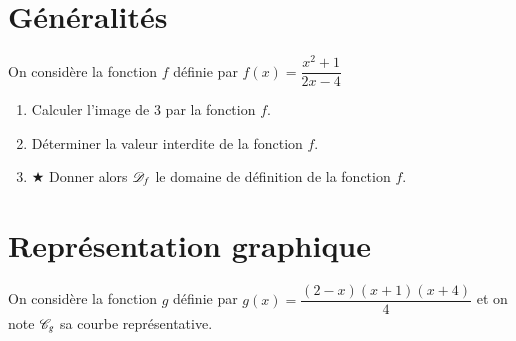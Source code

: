 \documentclass[oneside,12pt]{exam}          %
\begin{document}
\section{Généralités}
On considère la fonction $f$ définie par $f(x) = \dfrac{x^2 + 1}{2x - 4}$
\begin{enumerate}
	\item Calculer l'image de $3$ par la fonction $f$.
	\item Déterminer la valeur interdite de la fonction $f$.
	\item $\bigstar$ Donner alors ${\mathscr{D}}_f$ le domaine de définition de la fonction $f$.
\end{enumerate}



\section{Représentation graphique}
On considère la fonction $g$ définie par $g(x) = \dfrac{(2-x)(x+1)(x+4)}{4}$ et on note ${\mathscr{C}}_g$ sa courbe représentative.
\end{document}
